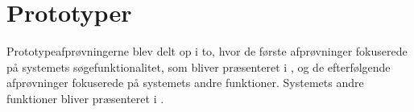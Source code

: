 \section{Prototyper}
\label{sec:prototyper}

Prototypeafprøvningerne blev delt op i to, hvor de første afprøvninger fokuserede på systemets søgefunktionalitet, som bliver præsenteret i , og de efterfølgende afprøvninger fokuserede på systemets andre funktioner. Systemets andre funktioner bliver præsenteret i .



